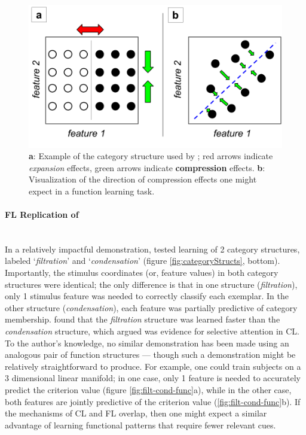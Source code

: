 \documentclass[12pt]{article}
\let\oldtextcite=\textcite
\renewcommand{\textcite}[1]{\textcolor[rgb]{0, .121, .388}{\oldtextcite{#1}}}
\begin{document}
\begin{figure}[H]
    \centering
    \includegraphics[scale=.4]{figures/CPinFL.png}
    \caption{\textbf{a}: Example of the category structure used by \textcite{goldstone1994role}; red arrows indicate \emph{expansion} effects, green arrows indicate \textbf{compression} effects. \textbf{b}: Visualization of the direction of compression effects one might expect in a function learning task.}
    \label{fig:CPinFL}
\end{figure} 

\paragraph{FL Replication of \textcite{kruschke1993human}} \label{fl_k93} \mbox{}\\

In a relatively impactful demonstration, \textcite{kruschke1993human} tested learning of 2 category structures, labeled `\emph{filtration}' and `\emph{condensation}' (figure \ref{fig:categoryStructs}, bottom). Importantly, the stimulus coordinates (or, feature values) in both category structures were identical; the only difference is that in one structure (\emph{filtration}), only 1 stimulus feature was needed to correctly classify each exemplar. In the other structure (\emph{condensation}), each feature was partially predictive of category membership. \textcite{kruschke1993human} found that the \emph{filtration} structure was learned faster than the \emph{condensation} structure, which \textcite{kruschke1993human} argued was evidence for selective attention in CL. To the author's knowledge, no similar demonstration has been made using an analogous pair of function structures --- though such a demonstration might be relatively straightforward to produce. For example, one could train subjects on a 3 dimensional linear manifold; in one case, only 1 feature is needed to accurately predict the criterion value (figure \ref{fig:filt-cond-func}a), while in the other case, both features are jointly predictive of the criterion value (\ref{fig:filt-cond-func}b). If the mechanisms of CL and FL overlap, then one might expect a similar advantage of learning functional patterns that require fewer relevant cues.
\end{document}
